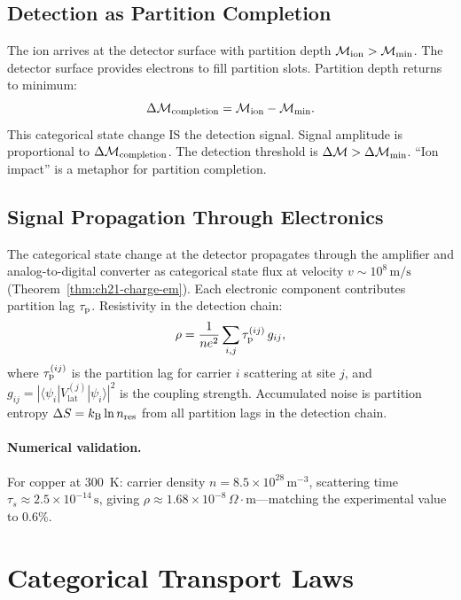\subsection{Detection as Partition Completion}

The ion arrives at the detector surface with partition depth $\mathcal{M}_{\mathrm{ion}}
> \mathcal{M}_{\min}$.  The detector surface provides electrons to fill partition
slots.  Partition depth returns to minimum:
\begin{equation}
  \Delta\mathcal{M}_{\mathrm{completion}} = \mathcal{M}_{\mathrm{ion}} - \mathcal{M}_{\min}.
\end{equation}
This categorical state change IS the detection signal.  Signal amplitude is
proportional to $\Delta\mathcal{M}_{\mathrm{completion}}$.  The detection threshold
is $\Delta\mathcal{M} > \Delta\mathcal{M}_{\min}$.  ``Ion impact'' is a metaphor for
partition completion.

\subsection{Signal Propagation Through Electronics}

The categorical state change at the detector propagates through the amplifier
and analog-to-digital converter as categorical state flux at velocity
$v \sim 10^8\,\mathrm{m/s}$ (Theorem~\ref{thm:ch21-charge-em}).  Each
electronic component contributes partition lag $\tau_{\mathrm{p}}$.  Resistivity in the
detection chain:
\begin{equation}
  \rho = \frac{1}{ne^2}\sum_{i,j}\tau_{\mathrm{p}}^{(ij)}\,g_{ij},
\end{equation}
where $\tau_{\mathrm{p}}^{(ij)}$ is the partition lag for carrier $i$ scattering at site
$j$, and $g_{ij} = |\langle\psi_i|V_{\mathrm{lat}}^{(j)}|\psi_i\rangle|^2$ is
the coupling strength.  Accumulated noise is partition entropy
$\Delta S = k_{\mathrm{B}}\ln n_{\mathrm{res}}$ from all partition lags in the detection chain.

\paragraph{Numerical validation.}
For copper at 300~K: carrier density $n = 8.5\times 10^{28}\,\mathrm{m}^{-3}$,
scattering time $\tau_s \approx 2.5\times 10^{-14}\,\mathrm{s}$,
giving $\rho \approx 1.68\times 10^{-8}\,\Omega\cdot\mathrm{m}$---matching
the experimental value to 0.6\%.

\section{Categorical Transport Laws}
\label{sec:ch21-transport}

